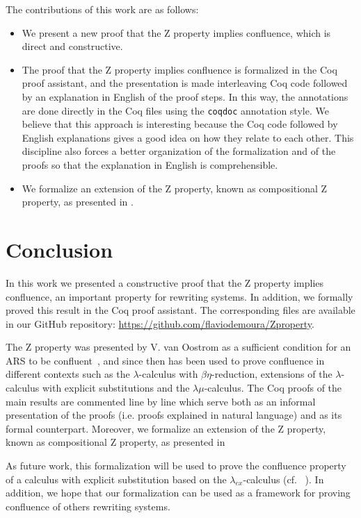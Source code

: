 \documentclass{llncs}
\begin{document}
The contributions of this work are as follows:
\begin{itemize}
\item We present a new proof that the Z property implies confluence, which is direct and constructive.
\item The proof that the Z property implies confluence is formalized in the Coq proof assistant\cite{teamCoqProofAssistant2024}, and the presentation is made interleaving Coq code followed by an explanation in English of the proof steps. In this way, the annotations are done directly in the Coq files using the {\tt coqdoc} annotation style. We believe that this approach is interesting because the Coq code followed by English explanations gives a good idea on how they relate to each other. This discipline also forces a better organization of the formalization and of the proofs so that the explanation in English is comprehensible.
\item We formalize an extension of the Z property, known as compositional Z property, as presented in \cite{nakazawaCompositionalConfluenceProofs2016}.
\end{itemize}




\section{Conclusion}

In this work we presented a constructive proof that the Z property
implies confluence, an important property for rewriting systems. In
addition, we formally proved this result in the Coq proof
assistant. The corresponding files are available in our GitHub
repository: \url{https://github.com/flaviodemoura/Zproperty}.

The Z property was presented by V. van Oostrom as a sufficient
condition for an ARS to be confluent~\cite{zproperty}, and since
then has been used to prove confluence in different contexts such as
the $\lambda$-calculus with $\beta\eta$-reduction, extensions of the
$\lambda$-calculus with explicit substitutions and the
$\lambda\mu$-calculus. The Coq proofs of the main results are
commented line by line which serve both as an informal presentation of
the proofs (i.e. proofs explained in natural language) and as its
formal counterpart. Moreover, we formalize an extension of the Z
property, known as compositional Z property, as presented in
\cite{Nakazawa-Fujita2016}

As future work, this formalization will be used to prove the
confluence property of a calculus with explicit substitution based on
the $\lambda_{ex}$-calculus (cf. ~\cite{kes09}). In addition, we hope
that our formalization can be used as a framework for proving
confluence of others rewriting systems.



\end{document}
